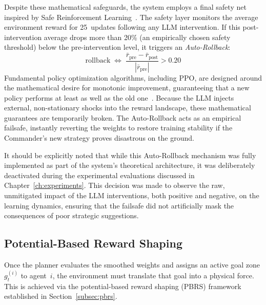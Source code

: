 Despite these mathematical safeguards, the system employs a final safety net inspired by Safe Reinforcement Learning~\parencite{Amodei_Olah_Steinhardt_Christiano_Schulman_Mané_2016}. The safety layer monitors the average environment reward for 25~updates following any LLM intervention. If this post-intervention average drops more than 20\% (an empirically chosen safety threshold) below the pre-intervention level, it triggers an \emph{Auto-Rollback}:
\begin{equation}
    \text{rollback}
    \;\Longleftrightarrow\;
    \frac{
        \bar{r}_{\text{pre}} - \bar{r}_{\text{post}}
    }{
        |\bar{r}_{\text{pre}}|
    }
    > 0.20
\end{equation}
Fundamental policy optimization algorithms, including PPO, are designed around the mathematical desire for monotonic improvement, guaranteeing that a new policy performs at least as well as the old one~\parencite{Schulman_Wolski_Dhariwal_Radford_Klimov_2017}. Because the LLM injects external, non-stationary shocks into the reward landscape, these mathematical guarantees are temporarily broken. The Auto-Rollback acts as an empirical failsafe, instantly reverting the weights to restore training stability if the Commander's new strategy proves disastrous on the ground.

It should be explicitly noted that while this Auto-Rollback mechanism was fully implemented as part of the system's theoretical architecture, it was deliberately deactivated during the experimental evaluations discussed in Chapter~\ref{ch:experiments}. This decision was made to observe the raw, unmitigated impact of the LLM interventions, both positive and negative, on the learning dynamics, ensuring that the failsafe did not artificially mask the consequences of poor strategic suggestions.

\subsection{Potential-Based Reward Shaping}
\label{sec:pbrs}

Once the planner evaluates the smoothed weights and assigns an active goal zone $g^{(i)}_t$ to agent~$i$, the environment must translate that goal into a physical force. This is achieved via the potential-based reward shaping (PBRS) framework established in Section~\ref{subsec:pbrs}.

